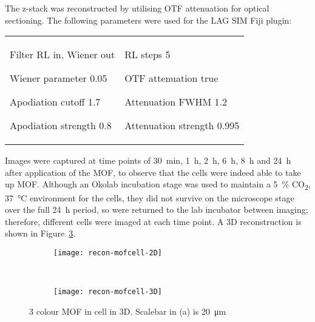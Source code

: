 The z-stack was reconstructed by utilising OTF attenuation for optical sectioning. 
The following parameters were used for the LAG SIM Fiji plugin:\newline
\begin{tabular}{p{}p{}}
\begin{labelling}[margin={Attenuation strength}]
	\item[Filter] RL in, Wiener out
	\item[Wiener parameter] 0.05
	\item[Apodiation cutoff] 1.7
	\item[Apodiation strength] 0.8
\end{labelling} &
\begin{labelling}[margin={Attenuation strength}]
	\item[RL steps] 5
	\item[OTF attenuation] true
	\item[Attenuation FWHM] 1.2
	\item[Attenuation strength] 0.995 
\end{labelling} %
\end{tabular}

Images were captured at time points of \SI{30}{\minute}, \SI{1}{\hour}, \SI{2}{\hour}, \SI{6}{\hour}, \SI{8}{\hour} and \SI{24}{\hour} after application of the MOF, to observe that the cells were indeed able to take up MOF.
Although an Okolab incubation stage was used to maintain a \SI{5}{\percent} CO\textsubscript{2}, \SI{37}{\degreeCelsius} environment for the cells, they did not survive on the microscope stage over the full \SI{24}{\hour} period, so were returned to the lab incubator between imaging; therefore, different cells were imaged at each time point. 
A 3D reconstruction is shown in Figure~\ref{fig:recon-mofcell}. 

\begin{figure}[tbp!]
\centering
\begin{subfigure}[b]{0.7\textwidth}
	\texttt{[image: recon-mofcell-2D]}
	\caption{}\label{fig:recon-mofcell-2D}
\end{subfigure}

~\newline
\begin{subfigure}[b]{0.7\textwidth}
	\texttt{[image: recon-mofcell-3D]}
	\caption{}\label{fig:recon-mofcell-3D}
\end{subfigure}
\caption[LAG SIM: 3D reconstruction of ?? cell]{3 colour MOF in cell in 3D. Scalebar in (a) is \SI{20}{\micro\metre}}
\label{fig:recon-mofcell}
\end{figure}


